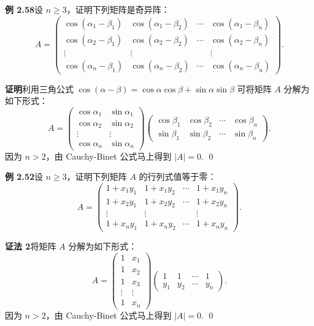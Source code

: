 \documentclass[UTF8,12pt,a4paper,fontset=fandol]{ctexart}
\begin{document}
\noindent\textbf{例 2.58}\quad 设 $n\ge3$，证明下列矩阵是奇异阵：
\[
A=
\left(
\begin{array}{cccc}
\cos(\alpha_1-\beta_1) & \cos(\alpha_1-\beta_2) & \cdots & \cos(\alpha_1-\beta_n)\\
\cos(\alpha_2-\beta_1) & \cos(\alpha_2-\beta_2) & \cdots & \cos(\alpha_2-\beta_n)\\
\vdots & \vdots & & \vdots\\
\cos(\alpha_n-\beta_1) & \cos(\alpha_n-\beta_2) & \cdots & \cos(\alpha_n-\beta_n)
\end{array}
\right).
\]

\noindent\textbf{证明}\quad 利用三角公式 $\cos(\alpha-\beta)=\cos\alpha\cos\beta+\sin\alpha\sin\beta$ 可将矩阵 $A$ 分解为如下形式：
\[
A=
\left(
\begin{array}{cc}
\cos\alpha_1 & \sin\alpha_1\\
\cos\alpha_2 & \sin\alpha_2\\
\vdots & \vdots\\
\cos\alpha_n & \sin\alpha_n
\end{array}
\right)
\left(
\begin{array}{cccc}
\cos\beta_1 & \cos\beta_2 & \cdots & \cos\beta_n\\
\sin\beta_1 & \sin\beta_2 & \cdots & \sin\beta_n
\end{array}
\right).
\]
因为 $n>2$，由 Cauchy-Binet 公式马上得到 $|A|=0$. \qed

\noindent\textbf{例 2.52}\quad 设 $n\ge3$，证明下列矩阵 $A$ 的行列式值等于零：
\[
A=
\left(
\begin{array}{cccc}
1+x_1y_1 & 1+x_1y_2 & \cdots & 1+x_1y_n\\
1+x_2y_1 & 1+x_2y_2 & \cdots & 1+x_2y_n\\
\vdots & \vdots & & \vdots\\
1+x_ny_1 & 1+x_ny_2 & \cdots & 1+x_ny_n
\end{array}
\right).
\]

\noindent\textbf{证法 2}\quad 将矩阵 $A$ 分解为如下形式：
\[
A=
\left(
\begin{array}{cc}
1 & x_1\\
1 & x_2\\
1 & x_3\\
\vdots & \vdots\\
1 & x_n
\end{array}
\right)
\left(
\begin{array}{cccc}
1 & 1 & \cdots & 1\\
y_1 & y_2 & \cdots & y_n
\end{array}
\right).
\]
因为 $n>2$，由 Cauchy-Binet 公式马上得到 $|A|=0$. \qed
\end{document}
